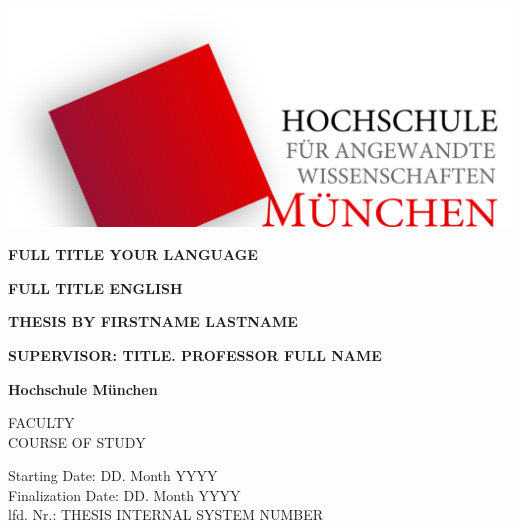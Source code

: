\documentclass{../Main/main.tex}{subfiles}
\begin{document}
\begin{center}
	\vspace{1cm}

	\includegraphics[width=\textwidth]{../resources/HochschuleMuenchenLogo-1200x521.png}

	\vspace{0.8cm}
	\textbf{FULL TITLE YOUR LANGUAGE}

	\vspace{0.8cm}
	\textbf{FULL TITLE ENGLISH}

	\vspace{0.8cm}
	\textbf{THESIS BY FIRSTNAME LASTNAME}

    \vspace{0.8cm}
    \textbf{SUPERVISOR: TITLE. PROFESSOR FULL NAME}

	\vfill
	\textbf{Hochschule München}

	FACULTY\\
	COURSE OF STUDY
	\vspace{1.5cm}

	Starting Date: DD. Month YYYY\\
	Finalization Date: DD. Month YYYY\\
	lfd. Nr.: THESIS INTERNAL SYSTEM NUMBER\\
\end{center}

\clearpage
\end{document}
